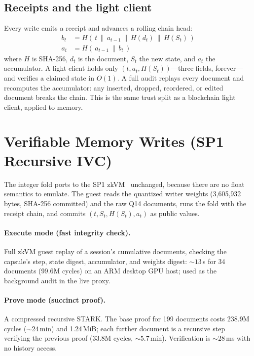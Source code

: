 \documentclass[11pt]{article}
\begin{document}
\subsection{Receipts and the light client}
\label{sec:receipts}
Every write emits a receipt and advances a rolling chain head:
\begin{align}
b_t &= H(\,t \,\|\, a_{t-1} \,\|\, H(d_t) \,\|\, H(S_t)\,)\\
a_t &= H(\,a_{t-1} \,\|\, b_t\,)
\end{align}
where $H$ is SHA-256, $d_t$ is the document, $S_t$ the new state, and
$a_t$ the accumulator. A light client holds only
$(t, a_t, H(S_t))$---three fields, forever---and verifies a claimed
state in $O(1)$. A full audit replays every document and recomputes
the accumulator: any inserted, dropped, reordered, or edited document
breaks the chain. This is the same trust split as a blockchain light
client, applied to memory.

\section{Verifiable Memory Writes (SP1 Recursive IVC)}
\label{sec:zk}
The integer fold ports to the SP1 zkVM~\cite{sp1} unchanged, because
there are no float semantics to emulate. The guest reads the quantized
writer weights (3{,}605{,}932 bytes, SHA-256 committed) and the raw
Q14 documents, runs the fold with the receipt chain, and commits
$(t, S_t, H(S_t), a_t)$ as public values.

\paragraph{Execute mode (fast integrity check).} Full zkVM guest replay
of a session's cumulative documents, checking the capsule's step, state
digest, accumulator, and weights digest: ${\sim}13$\,s for 34 documents
(99.6M cycles) on an ARM desktop GPU host; used as the background
audit in the live proxy.

\paragraph{Prove mode (succinct proof).} A compressed recursive STARK.
The base proof for 199 documents costs 238.9M cycles (${\sim}24$\,min)
and 1.24\,MiB; each further document is a recursive step verifying the
previous proof (33.8M cycles, ${\sim}5.7$\,min). Verification is
${\sim}28$\,ms with no history access.
\end{document}
